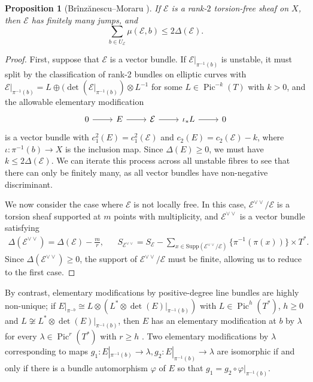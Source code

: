 \documentclass{article}[12pt]
\newtheorem{proposition}[theorem]{Proposition}
\theoremstyle{definition}
\theoremstyle{remark}
\numberwithin{equation}{section}
\newcommand \mc{\mathcal}
\DeclareMathOperator{\Pic}{Pic}
\begin{document}
\begin{proposition}[Br\^inz\u anescu--Moraru \cite{BrMor}]\label{FiniteUnstable}
	If $\mc{E}$ is a rank-$2$ torsion-free sheaf on $X$, then $\mc{E}$ has finitely many jumps, and $$\sum\limits_{b\in U_\mc{E}} \mu(\mc{E}, b)\leq 2\Delta(\mc{E}).$$
\end{proposition}
\begin{proof}
	First, suppose that $\mc{E}$ is a vector bundle. If $\mc{E}|_{\pi^{-1}(b)}$ is unstable, it must split by the classification of rank-2 bundles on elliptic curves with $\mc{E}|_{\pi^{-1}(b)}=L\oplus (\det(\mc{E}|_{\pi^{-1}(b)})\otimes L^{-1}$ for some $L \in \Pic^{-k}(T)$ with $k>0$, and the allowable elementary modification $$\begin{tikzcd} 0 \arrow[r] & E \arrow[r] & \mc{E} \arrow[r] & \iota_*L \arrow[r] & 0\end{tikzcd}$$
	is a vector bundle with $c_1^2(E)=c_1^2(\mc{E})$ and $c_2(E)=c_2(\mc{E})-k$, where $\iota:\pi^{-1}(b)\to X$ is the inclusion map. Since $\Delta(E)\geq 0$, we must have $k\leq 2\Delta(\mc{E})$. We can iterate this process across all unstable fibres to see that there can only be finitely many, as all vector bundles have non-negative discriminant.
	
	We now consider the case where $\mc{E}$ is not locally free. In this case, $\mc{E}^{\vee\vee}/\mc{E}$ is a torsion sheaf supported at $m$ points with multiplicity, and $\mc{E}^{\vee\vee}$ is a vector bundle satisfying \begin{align*}
		\Delta(\mc{E}^{\vee\vee})=\Delta(\mc{E})-\frac{m}{r}, &&S_{\mc{E}^{\vee\vee}}=S_{\mc{E}}-\sum\limits_{x \in \text{Supp}(\mc{E}^{\vee\vee}/\mc{E})} \{\pi^{-1}(\pi(x))\}\times T^*.
	\end{align*}
	Since $\Delta(\mc{E}^{\vee\vee})\geq 0$, the support of $\mc{E}^{\vee\vee}/\mc{E}$ must be finite, allowing us to reduce to the first case. 
\end{proof}

By contrast, elementary modifications by positive-degree line bundles are highly non-unique; if $E|_{\pi^{-b}}\cong L\otimes (L^*\otimes \det(E)|_{\pi^{-1}(b)})$ with $L \in \Pic^h(T^*)$, $h\geq 0$ and $L\not\cong L^*\otimes \det(E)|_{\pi^{-1}(b)}$, then $E$ has an elementary modification at $b$ by $\lambda$ for every $\lambda \in \Pic^r(T^*)$ with $r\geq h$ \cite[Section 4.1.3]{MorHopf}. Two elementary modifications by $\lambda$ corresponding to maps $g_1:E|_{\pi^{-1}(b)}\to \lambda, g_2:E|_{\pi^{-1}(b)}\to \lambda$ are isomorphic if and only if there is a bundle automorphism $\varphi$ of $E$ so that $g_1=g_2\circ \varphi|_{\pi^{-1}(b)}$.
\end{document}
